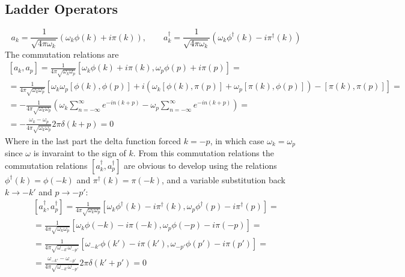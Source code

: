 \documentclass{article}
\begin{document}
\subsection{Ladder Operators}
\begin{equation}
    a_k = \frac{1}{\sqrt{4\pi \omega_k}}\left(\omega_k\phi(k) + i\pi(k)\right), \qquad
    a_k^\dagger = \frac{1}{\sqrt{4\pi \omega_k}}\left(\omega_k\phi^\dagger(k) - i\pi^\dagger(k)\right)
\end{equation}
The commutation relations are
\begin{equation}
\begin{gathered}
    \left[a_k, a_p\right] = \frac{1}{4\pi \sqrt{\omega_k\omega_p}}
    \left[
        \omega_k\phi(k) + i\pi(k),
        \omega_p\phi(p) + i\pi(p)
    \right] = \\
    = \frac{1}{4\pi \sqrt{\omega_k\omega_p}}
    \left[
    \omega_k\omega_p [\phi(k), \phi(p)]
    + i \left(
        \omega_k[\phi(k),\pi(p)] + \omega_p[\pi(k), \phi(p)]
    \right)
    - [\pi(k), \pi(p)]
    \right] = \\
    = - \frac{1}{4\pi \sqrt{\omega_k\omega_p}}
    \left(
        \omega_k \sum_{n=-\infty}^\infty e^{-in(k+p)} -
        \omega_p \sum_{n=-\infty}^\infty e^{-in(k+p)}
    \right) = \\
    = - \frac{\omega_k - \omega_p}{4\pi \sqrt{\omega_k\omega_p}} 2\pi \delta(k+p) = 0
\end{gathered}
\end{equation}
Where in the last part the delta function forced $k = -p$, in which case $\omega_k = \omega_p$ since $\omega$ is invaraint to the sign of $k$. From this commutation relations the commutation relations $\left[a^\dagger_k, a^\dagger_p\right]$ are obvious to develop using the relations $\phi^\dagger(k) = \phi(-k)$ and $\pi^\dagger(k) = \pi(-k)$, and a variable substitution back $k \rightarrow -k'$ and $p \rightarrow -p'$:
\begin{equation}
\begin{gathered}
    \left[a_k^\dagger, a_p^\dagger\right] = \frac{1}{4\pi \sqrt{\omega_k\omega_p}}
    \left[
        \omega_k\phi^\dagger(k) - i\pi^\dagger(k),
        \omega_p\phi^\dagger(p) - i\pi^\dagger(p)
    \right] = \\
     = \frac{1}{4\pi \sqrt{\omega_k\omega_p}}
    \left[
        \omega_k\phi(-k) - i\pi(-k),
        \omega_p\phi(-p) - i\pi(-p)
    \right] = \\
     = \frac{1}{4\pi \sqrt{\omega_{-k'}\omega_{-p'}}}
    \left[
        \omega_{-k'}\phi(k') - i\pi(k'),
        \omega_{-p'}\phi(p') - i\pi(p')
    \right] = \\
    = \frac{\omega_{-k'} - \omega_{-p'}}{4\pi \sqrt{\omega_{-k'}\omega_{-p'}}} 2\pi \delta(k'+p') = 0
\end{gathered}
\end{equation}
\end{document}
